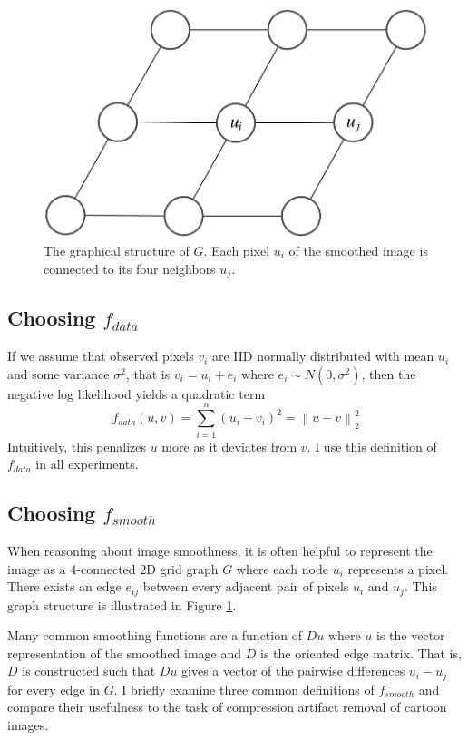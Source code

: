 \documentclass[10pt,twocolumn,letterpaper]{article}
\begin{document}
\begin{figure}[t]
\includegraphics[width = \linewidth]{graph2.png}
\caption{The graphical structure of $G$. Each pixel $u_i$ of the smoothed image is connected to its four neighbors $u_j$.}
\label{fig:graph2}
\end{figure}

\subsection{Choosing $f_{data}$}
If we assume that observed pixels $v_i$ are IID normally distributed with mean $u_i$ and some variance $\sigma^2$, that is $ v_i = u_i + e_i $ where $e_i \sim N(0, \sigma^2) $, then the negative log likelihood yields a quadratic term 
$$
	f_{data}(u, v) = \sum_{i=1}^n{(u_i - v_i)^2} = \left \| u - v \right \|_2^2
$$
Intuitively, this penalizes $u$ more as it deviates from $v$. I use this definition of $f_{data}$ in all experiments.

\subsection{Choosing $f_{smooth}$}

When reasoning about image smoothness, it is often helpful to represent the image as a 4-connected 2D grid graph $G$ where each node $u_i$ represents a pixel. There exists an edge $e_{ij}$ between every adjacent pair of pixels $u_i$ and $u_j$. This graph structure is illustrated in Figure \ref{fig:graph2}.

Many common smoothing functions are a function of $ Du $ where $u$ is the vector representation of the smoothed image and $D$ is the oriented edge matrix. That is, $ D $ is constructed such that $ Du $ gives a vector of the pairwise differences $ u_i - u_j $ for every edge in $ G $. I briefly examine three common definitions of $f_{smooth}$ and compare their usefulness to the task of compression artifact removal of cartoon images.
\end{document}
